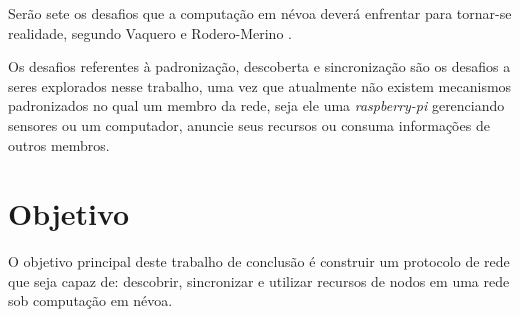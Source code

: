 Serão sete os desafios que a computação em névoa deverá enfrentar para tornar-se realidade, segundo Vaquero e Rodero-Merino \cite{Vaquero:2014}.

Os desafios referentes à padronização, descoberta e sincronização são os desafios a seres explorados nesse trabalho, uma vez que atualmente não existem mecanismos padronizados no qual um membro da rede, seja ele uma \textit{raspberry-pi} gerenciando sensores ou um computador, anuncie seus recursos ou consuma informações de outros membros.

\section{Objetivo}


O objetivo principal deste trabalho de conclusão é construir um protocolo de rede que seja capaz de: descobrir, sincronizar e utilizar recursos de nodos em uma rede sob computação em névoa.       






 
 
 
 
 
 
 
 









